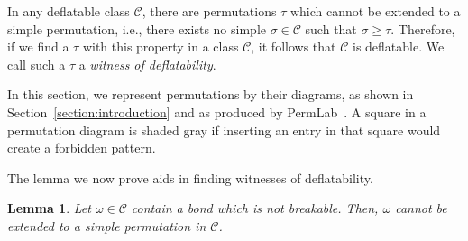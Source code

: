 \documentclass[10pt]{article}
\theoremstyle{plain}
\newtheorem{lemma}[theorem]{Lemma}
\newcommand{\C}{\mathcal{C}}
\begin{document}
In any deflatable class $\C$, there are permutations $\tau$ which cannot be extended to a simple permutation, i.e., there exists no simple $\sigma \in \C$ such that $\sigma \geq \tau$. Therefore, if we find a $\tau$ with this property in a class $\C$, it follows that $\C$ is deflatable. We call such a $\tau$ a \emph{witness of deflatability}.

In this section, we represent permutations by their diagrams, as shown in Section~\ref{section:introduction} and as produced by PermLab~\cite{albert:permlab}. A square in a permutation diagram is shaded gray if inserting an entry in that square would create a forbidden pattern. 

The lemma we now prove aids in finding witnesses of deflatability.

\begin{lemma}
	\label{lemma:witness-extension}
	Let $\omega \in \C$ contain a bond which is not breakable. 
	Then, $\omega$ cannot be extended to a simple permutation in $\C$.
\end{lemma}
\end{document}
